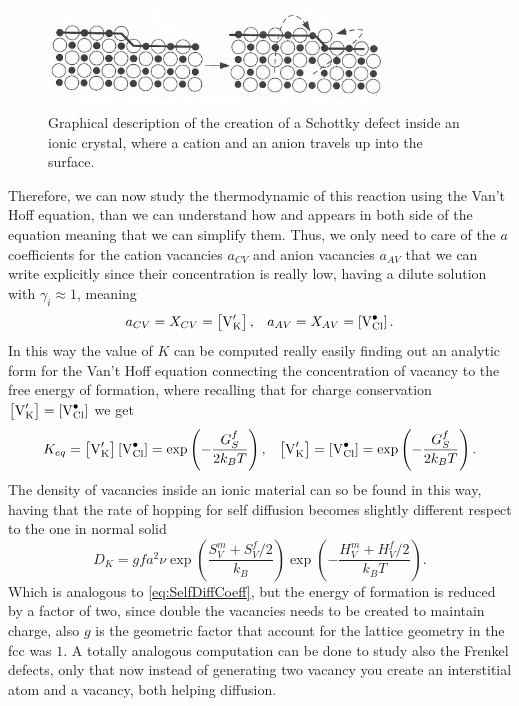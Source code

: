 \begin{figure}[b]
    \centering
    \includegraphics[width=0.8\textwidth]{Immagini/SChotckyCreation.png}
    \caption
    {
        Graphical description of the creation of a Schottky defect inside an ionic crystal, where a cation and an anion travels up into the surface.
    }
    \label{fig:SChotckyCreation}
\end{figure}
Therefore, we can now study the thermodynamic of this reaction using the Van't Hoff equation, than we can understand how  and  appears in both side of the equation meaning that we can simplify them. Thus, we only need to care of the $a$ coefficients for the cation vacancies $a_{CV}$ and anion vacancies $a_{AV}$ that we can write explicitly since their concentration is really low, having a dilute solution with $\gamma_i \approx 1$, meaning
\begin{align}
    &a_{CV} = X_{CV} = \left[ \ce{V_K}^\prime \right], &a_{AV} = X_{AV} = \left[ \ce{V_{Cl}}^\bullet \right].
\end{align}
In this way the value of $K$ can be computed really easily finding out an analytic form for the Van't Hoff equation connecting the concentration of vacancy to the free energy of formation, where recalling that for charge conservation $\left[ \ce{V_K}^\prime \right] = \left[ \ce{V_{Cl}}^\bullet \right]$ we get
\begin{align}
    &K_{eq} = \left[ \ce{V_K}^\prime \right] \left[ \ce{V_{Cl}}^\bullet \right] = \exp\left( -\frac{G_S^f}{2k_BT} \right), &\left[ \ce{V_K}^\prime \right] = \left[ \ce{V_{Cl}}^\bullet \right] = \exp\left( -\frac{G_S^f}{2k_BT} \right).
\end{align}
The density of vacancies inside an ionic material can so be found in this way, having that the rate of hopping for self diffusion becomes slightly different respect to the one in normal solid
\begin{equation}
    \label{eq:DiffusivityIonic}
    D_{K} = gfa^2\nu \exp\left( \frac{S_V^m + S_V^f/2}{k_B} \right)\exp\left( -\frac{H_V^m + H_V^f/2}{k_BT} \right).
\end{equation}
Which is analogous to \eqref{eq:SelfDiffCoeff}, but the energy of formation is reduced by a factor of two, since double the vacancies needs to be created to maintain charge, also $g$ is the geometric factor that account for the lattice geometry in the fcc was $1$. A totally analogous computation can be done to study also the Frenkel defects, only that now instead of generating two vacancy you create an interstitial atom and a vacancy, both helping diffusion.

